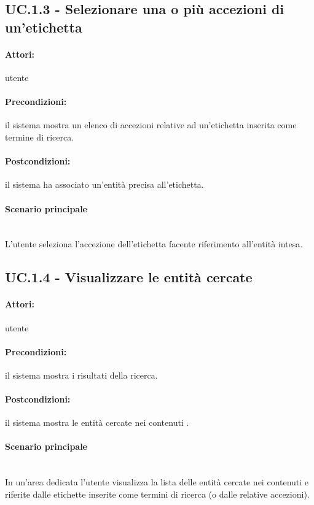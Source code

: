 \documentclass[10pt,a4paper,headinclude,footinclude,hidelinks]{scrreprt} %
\begin{document}
	\subsection[UC.1.3]{UC.1.3 - Selezionare una o più accezioni di un'etichetta}
	\label{sec:stage:ar:uc:1_3}
	\paragraph{Attori:} utente
	\paragraph{Precondizioni:} il sistema mostra un elenco di accezioni relative ad un'etichetta inserita come termine di ricerca.
	\paragraph{Postcondizioni:} il sistema ha associato un'entità precisa all'etichetta.
	\paragraph{Scenario principale}  \hfill \\
	L'utente seleziona l'accezione dell'etichetta facente riferimento all'entità intesa.

	\subsection[UC.1.4]{UC.1.4 - Visualizzare le entità cercate}
	\label{sec:stage:ar:uc:1_4}
	\paragraph{Attori:} utente
	\paragraph{Precondizioni:} il sistema mostra i risultati della ricerca.
	\paragraph{Postcondizioni:} il sistema mostra le entità cercate nei contenuti .
	\paragraph{Scenario principale} \hfill \\
	In un'area dedicata l'utente visualizza la lista delle entità cercate nei contenuti e riferite dalle etichette inserite come termini di ricerca (o dalle relative accezioni).
\end{document}

